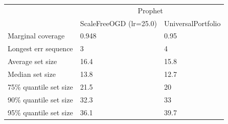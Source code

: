 \begin{tabular}{lll}
\toprule
& \multicolumn{2}{c}{Prophet} \\
& ScaleFreeOGD (lr=25.0) & UniversalPortfolio \\
\midrule
Marginal coverage & 0.948 & 0.95 \\
Longest err sequence & 3 & 4 \\
Average set size & 16.4 & 15.8 \\
Median set size & 13.8 & 12.7 \\
75\% quantile set size & 21.5 & 20 \\
90\% quantile set size & 32.3 & 33 \\
95\% quantile set size & 36.1 & 39.7 \\
\bottomrule
\end{tabular}
